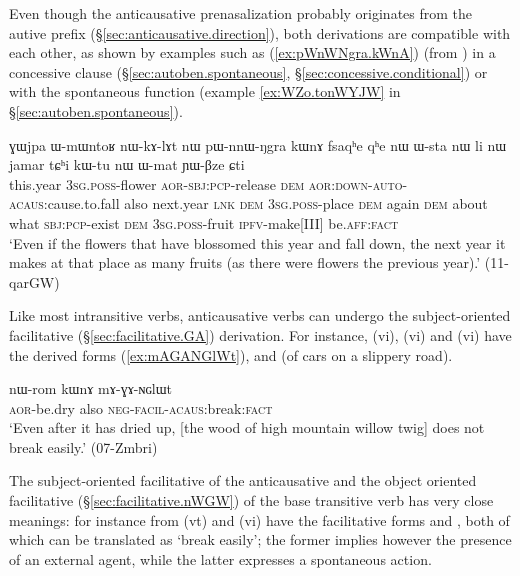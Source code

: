 Even though the anticausative prenasalization probably originates from the autive  prefix (§\ref{sec:anticausative.direction}), both derivations are compatible with each other, as shown by examples such as  (\ref{ex:pWnWNgra.kWnA}) (from ) in a concessive clause (§\ref{sec:autoben.spontaneous}, §\ref{sec:concessive.conditional}) or with the spontaneous function (example \ref{ex:WZo.tonWYJW} in §\ref{sec:autoben.spontaneous}).

\begin{exe}
\ex \label{ex:pWnWNgra.kWnA}
\gll ɣɯjpa ɯ-mɯntoʁ nɯ-kɤ-lɤt nɯ pɯ-nnɯ-ŋgra kɯnɤ fsaqʰe qʰe nɯ ɯ-sta nɯ li nɯ jamar tɕʰi kɯ-tu nɯ ɯ-mat ɲɯ-βze ɕti  \\
this.year \textsc{3sg}.\textsc{poss}-flower \textsc{aor}-\textsc{sbj}:\textsc{pcp}-release \textsc{dem} \textsc{aor}:\textsc{down}-\textsc{auto}-\textsc{acaus}:cause.to.fall also next.year \textsc{lnk} \textsc{dem} \textsc{3sg}.\textsc{poss}-place \textsc{dem} again \textsc{dem} about what \textsc{sbj}:\textsc{pcp}-exist \textsc{dem} \textsc{3sg}.\textsc{poss}-fruit \textsc{ipfv}-make[III] be.\textsc{aff}:\textsc{fact} \\
\glt `Even if the flowers that have blossomed this year and fall down, the next year it makes at that place as many fruits (as there were flowers the previous year).' (11-qarGW)
\end{exe}

Like most intransitive verbs,  anticausative verbs can undergo the subject-orien\-ted facilitative (§\ref{sec:facilitative.GA})  derivation. For instance,  (vi),  (vi) and  (vi) have the derived forms   (\ref{ex:mAGANGlWt}),  and  (of cars on a slippery road). 

\begin{exe}
\ex \label{ex:mAGANGlWt}
\gll nɯ-rom kɯnɤ mɤ-ɣɤ-ɴɢlɯt  \\
\textsc{aor}-be.dry also \textsc{neg}-\textsc{facil}-\textsc{acaus}:break:\textsc{fact} \\
\glt `Even after it has dried up, [the wood of high mountain willow twig] does not break easily.' (07-Zmbri) 
\end{exe}

The subject-oriented facilitative of the anticausative and the object oriented facilitative   (§\ref{sec:facilitative.nWGW}) of the base transitive verb has very close meanings: for instance from  (vt) and  (vi) have the facilitative forms  and , both of which can be translated as `break easily'; the former implies however the presence of an external agent, while the latter expresses a spontaneous action.

